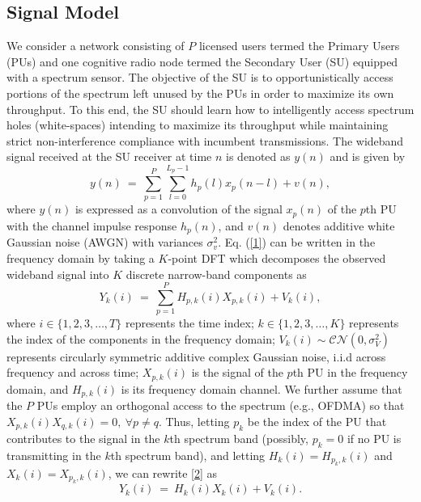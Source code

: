 \documentclass[10pt,twocolumn]{IEEEtran}
\newcommand{\sst}[1]{}
\newcommand{\add}[1]{{\color{red}{#1}}}
\begin{document}
\subsection{Signal Model}\label{A}
We consider a network consisting of $P$ licensed users termed the Primary Users (PUs) and one cognitive radio node termed the Secondary User (SU) equipped with a spectrum sensor. The objective of the SU is to opportunistically access portions of the spectrum left unused by the PUs in order to maximize its own throughput. To this end, the SU should learn how to intelligently access spectrum holes (white-spaces) intending to maximize its throughput while maintaining strict non-interference compliance with incumbent transmissions.
The wideband signal received at the SU receiver at time $n$ is denoted as $y(n)$ and is given by 
\begin{equation}\label{1}
    y(n)\ =\ \sum_{p=1}^{P}\sum_{l=0}^{L_{p}-1} h_{p}(l)x_{p}(n-l) + v(n),
\end{equation}
where $y(n)$ is expressed as a convolution of the signal $x_{p}(n)$ of the $p$th PU with the channel impulse response $h_{p}(n)$, and $v(n)$ denotes additive white Gaussian noise (AWGN) with variances $\sigma_v^2$. Eq. (\ref{1}) can be written in the frequency domain by taking a $K$-point DFT which decomposes the observed wideband signal into $K$ discrete narrow-band components as 
\begin{equation}\label{2}
    Y_k(i)\ =\ \sum_{p=1}^{P}H_{p,k}(i)X_{p,k}(i)+V_k(i),
\end{equation}
where $i {\in} \{1,2,3,\dots,T\}$ represents the time index; $k {\in} \{1,2,3,\dots,K\}$ represents the index of the components in the frequency domain; $V_k(i) {\sim} \mathcal{CN}(0,\sigma_V^2)$ represents\sst{ a} circularly symmetric additive complex Gaussian noise\sst{ sample}, i.i.d across frequency and across time\add{, and independent of $H$ and X}; $X_{p,k}(i)$ is the signal of the $p$th PU in the frequency domain, and $H_{p,k}(i)$ is its frequency domain channel.\sst{ The noise samples are assumed to be independent of the occupancy state of the channels.} We further assume that the $P$ PUs employ an orthogonal access to the spectrum (e.g., OFDMA) so that $X_{p,k}(i)X_{q,k}(i)=0,\ \forall p\neq q$. Thus, letting $p_k$ be the index of the PU that contributes to the signal in the $k$th spectrum band (possibly, $p_k=0$ if no PU is transmitting in the $k$th spectrum band), and letting  $H_{k}(i)=H_{p_k,k}(i)$ and $X_{k}(i)=X_{p_k,k}(i)$, we can rewrite \eqref{2} as 
\begin{equation}\label{3}
    Y_k(i)\ =\ H_{k}(i)X_{k}(i) + V_k(i).
\end{equation}
\end{document}
